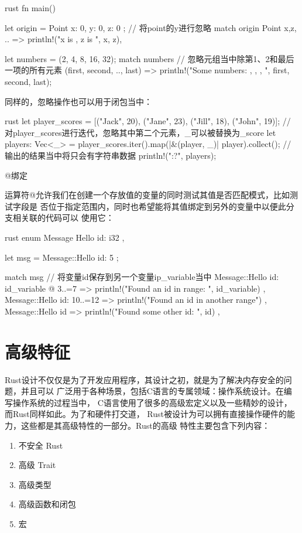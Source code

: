 \begin{outline}[enumerate]
\begin{code-in-enumerate}{rust}
fn main() {
    let origin = Point { x: 0, y: 0, z: 0 };
    // 将point的y进行忽略
    match origin {
        Point { x,z, .. } => println!("x is {}, z is {}", x, z),
    }

    let numbers = (2, 4, 8, 16, 32);
    match numbers {
        // 忽略元组当中除第1、2和最后一项的所有元素
        (first, second, .., last) => {
            println!("Some numbers: {}, {}, {}, ", first, second, last);
        }
    }
}
\end{code-in-enumerate}

同样的，忽略操作也可以用于闭包当中：
\begin{code-in-enumerate}{rust}
let player_scores = [("Jack", 20), ("Jane", 23), ("Jill", 18), ("John", 19)];
// 对player_scores进行迭代，忽略其中第二个元素，_可以被替换为_score
let players: Vec<_> = player_scores.iter().map(|&(player, _)| player).collect();
// 输出的结果当中将只会有字符串数据
println!("{:?}", players);
\end{code-in-enumerate}


\1 @绑定

运算符@允许我们在创建一个存放值的变量的同时测试其值是否匹配模式，比如测试字段是
否位于指定范围内，同时也希望能将其值绑定到另外的变量中以便此分支相关联的代码可以
使用它：
\begin{code-in-enumerate}{rust}
enum Message {
    Hello { id: i32 },
}

let msg = Message::Hello { id: 5 };

match msg {
    // 将变量id保存到另一个变量ip_variable当中
    Message::Hello { id: id_variable @ 3..=7 } => {
        println!("Found an id in range: {}", id_variable)
    },
    Message::Hello { id: 10..=12 } => {
        println!("Found an id in another range")
    },
    Message::Hello { id } => {
        println!("Found some other id: {}", id)
    },
}
\end{code-in-enumerate}
\end{outline}

\section{高级特征}
Rust设计不仅仅是为了开发应用程序，其设计之初，就是为了解决内存安全的问题，并且可以
广泛用于各种场景，包括C语言的专属领域：操作系统设计。在编写操作系统的过程当中，
C语言使用了很多的高级宏定义以及一些精妙的设计，而Rust同样如此。为了和硬件打交道，
Rust被设计为可以拥有直接操作硬件的能力，这些都是其高级特性的一部分。Rust的高级
特性主要包含下列内容：
\begin{enumerate}
  \item 不安全 Rust
  \item 高级 Trait
  \item 高级类型
  \item 高级函数和闭包
  \item 宏
\end{enumerate}

